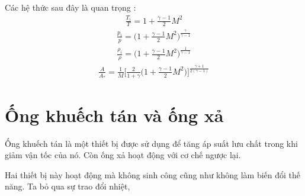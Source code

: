 \documentclass[DONG_CHAY_NEN_DUOC.tex]{subfiles}
\begin{document}
Các hệ thức sau đây là quan trọng :
\begin{equation}
	\begin{aligned}
		\boxed{
		\frac{T_i}{T} = 1 + \frac{\gamma-1}{2}M^2
		}
	\end{aligned}
\end{equation}
\begin{equation}
	\begin{aligned}
		\boxed{
		\frac{p_i}{p} = \Bigg( 1 + \frac{\gamma-1}{2}M^2 \Bigg)^{\frac{\gamma}{\gamma-1}}
		}
	\end{aligned}
\end{equation}
\begin{equation}
	\begin{aligned}
		\boxed{
		\frac{\rho_i}{\rho} = \Bigg( 1 + \frac{\gamma-1}{2}M^2 \Bigg)^{\frac{1}{\gamma-1}}
		}
	\end{aligned}
\end{equation}
\begin{equation}
	\begin{aligned}
		\boxed{
		\frac{A}{A_*} = \frac{1}{M}\Biggl[\frac{2}{1+\gamma}\Bigg(1 + \frac{\gamma-1}{2}M^2 \Bigg)\Biggr]^{\frac{\gamma+1}{2(\gamma-1)}}
		}
	\end{aligned}
\end{equation}




\section{Ống khuếch tán và ống xả}
Ống khuếch tán là một thiết bị được sử dụng để tăng áp suất lưu chất trong khi giảm vận tốc của nó. Còn ống xả hoạt động với cơ chế ngược lại.

Hai thiết bị này hoạt động mà không sinh công cũng như không làm biến đổi thế năng. Ta bỏ qua sự trao đổi nhiệt, 
\end{document}
